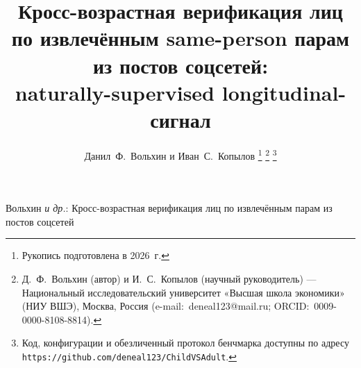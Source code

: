 \documentclass[journal]{IEEEtran}
\begin{document}
\title{Кросс-возрастная верификация лиц по извлечённым same-person парам из постов соцсетей:\\ naturally-supervised longitudinal-сигнал}

\author{Данил~Ф.~Вольхин и Иван~С.~Копылов%
\thanks{Рукопись подготовлена в 2026~г.}%
\thanks{Д.~Ф.~Вольхин (автор) и И.~С.~Копылов (научный руководитель) --- Национальный исследовательский университет «Высшая школа экономики» (НИУ ВШЭ), Москва, Россия (e-mail:~deneal123@mail.ru; ORCID:~0009-0000-8108-8814).}%
\thanks{Код, конфигурации и обезличенный протокол бенчмарка доступны по адресу \texttt{https://github.com/deneal123/ChildVSAdult}.}}

%
{Вольхин \MakeLowercase{\textit{и др.}}: Кросс-возрастная верификация лиц по извлечённым парам из постов соцсетей}
\end{document}
